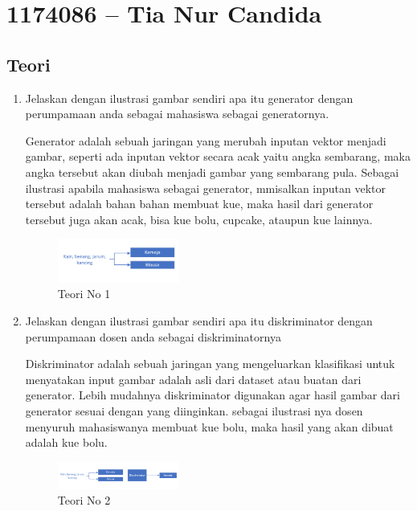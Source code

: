 \section{1174086 – Tia Nur Candida}
    \subsection{Teori}
        \begin{enumerate}
            \item Jelaskan dengan ilustrasi gambar sendiri apa itu generator dengan perumpamaan anda sebagai mahasiswa sebagai generatornya.
            \par Generator adalah sebuah jaringan yang merubah inputan vektor menjadi gambar, seperti ada inputan vektor secara acak yaitu angka sembarang, maka angka tersebut akan diubah menjadi gambar yang sembarang pula. Sebagai ilustrasi apabila mahasiswa sebagai generator, mmisalkan inputan vektor tersebut adalah bahan bahan membuat kue, maka hasil dari generator tersebut juga akan acak, bisa kue bolu, cupcake, ataupun kue lainnya.
            \begin{figure}[H]
                \includegraphics[width=4cm]{figures/1174086/chapter8/teori1.png}
                \centering
                  \caption{Teori No 1}
            \end{figure}

            \item Jelaskan dengan ilustrasi gambar sendiri apa itu diskriminator dengan perumpamaan dosen anda sebagai diskriminatornya
            \par Diskriminator adalah sebuah jaringan yang mengeluarkan klasifikasi untuk menyatakan input gambar adalah asli dari dataset atau buatan dari generator. Lebih mudahnya diskriminator digunakan agar hasil gambar dari generator sesuai dengan yang diinginkan. sebagai ilustrasi nya dosen menyuruh mahasiswanya membuat kue bolu, maka hasil yang akan dibuat adalah kue bolu.
            \begin{figure}[H]
                \includegraphics[width=4cm]{figures/1174086/chapter8/teori2.png}
                \centering
                  \caption{Teori No 2}
            \end{figure}


\end{enumerate}
